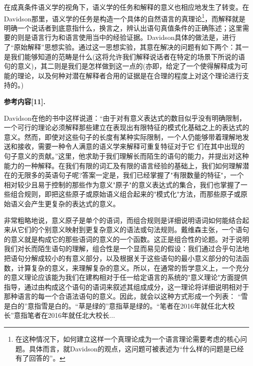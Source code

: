 \documentclass{article}
\begin{document}
在成真条件语义学的视角下，语义学的任务和解释的意义也相应地发生了转变。在Davidson那里，语义学的任务是构造一个具体的自然语言的真理论\footnote{在这种情况下，如何建立这样一个真理论成为一个语言理论需要考虑的核心问题。具体而言，就Davidson的观点，这问题可被表述为“什么样的问题是已经有了回答的”。}，而解释就是明确一个说话者到底意指什么，换言之，辨认出语句真值条件的正确陈述；这里需要的则是语言行为和语言使用当中的经验证据。Davidson具体的做法是，进行了“原始解释”思想实验。通过这一思想实验，其意在解决的问题有如下两个：其一是我们能够知道的范畴是什么(这将允许我们解释说话者在特定的场景下所说的语句的意义)，其二则是我们是怎样做到这一点的(亦即，给定了一个使得解释成为可能的理论，以及何种对潜在解释者合用的证据是在合理的程度上对这个理论进行支持的。)

\textbf{\kaishu 参考内容[11].}
{
Davidson在他的书中这样说道：“由于对有意义表达式的数目似乎没有明确限制，一个可行的理论必须解释那些建立在表现出有限特征的模式化基础之上的表达式的意义。然而，即使对这些句子的长度有某种实际限制，一个人仍能够带着理解地发送和接收，需要一种令人满意的语义学来解释可重复特征对于它 们在其中出现的句子意义的贡献。”这里，他求助于我们理解长而陌生的语句的能力，并提出对这种能力的一种解释。在我们有限的词汇及有限的语言经验的基础上，我们如何理解潜在的无限多的英语句子呢?答案一定是，我们已经掌握了"有限数量的特征"，一个相对较少且易于控制的那些作为意义"原子"的意义表达式的集合，我们也掌握了一些组合规则，即把这些原子或原始语义组合起来的"模式化"方法，而那些原子或原始语义会产生更复杂的表达式的意义。

非常粗略地说，意义原子是单个的语词，而组合规则是详细说明语词如何能结合起来从它们的个别意义映射到更复杂意义的语法或句法规则。戴维森主张，一个语句的意义就是构成它的那些语词的意义的一个函数。这正是组合性的论题。对于说明我们对长而陌生语句的理解，组合性是一个显而易见的假设：我们通过合乎句法地把语句分解成较小的有意义部分，以及根据关于这些语句的最小意义部分的句法函数，计算复杂的意义，来理解复杂的意义。所以，在通常的哲学意义上，一个充分的意义理论应该能为我们在建构相对于任一给定语言的系统的"意义理论"方面提供指导，通过由构成这个语句的语词来叙述其组成成分，这一理论将详细说明相对于那种语言的每一个合语法语句的意义。因此，就会以这种方式形成一个列表：
“雪是白的”意指雪是白的。“草是绿的”意指草是绿的。“笔者在2016年就任北大校长”意指笔者在2016年就任北大校长...

}
\end{document}
